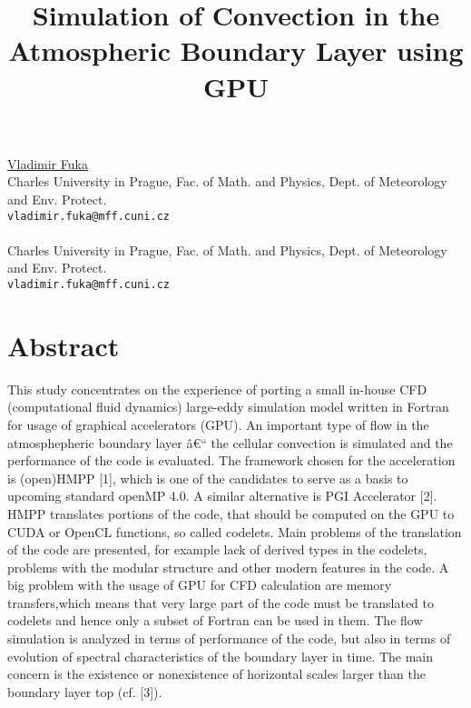 \title{Simulation of Convection in the Atmospheric Boundary Layer using GPU}
 \author{} \institute{}
\maketitle
\begin{center}
{\large \underline{Vladimir Fuka}}\\
Charles University in Prague, Fac. of Math. and Physics, Dept. of Meteorology and Env. Protect.\\
{\tt vladimir.fuka@mff.cuni.cz}
\\ \vspace{4mm}{\large Josef Brechler}\\
Charles University in Prague, Fac. of Math. and Physics, Dept. of Meteorology and Env. Protect.\\
{\tt vladimir.fuka@mff.cuni.cz}

\end{center}

\section*{Abstract}

This study concentrates on the experience of porting a small in-house CFD (computational fluid dynamics) large-eddy simulation model written in Fortran for usage of graphical accelerators (GPU). An important type of flow in the atmosphepheric boundary layer â€“ the cellular convection is simulated and the performance of the code is evaluated. The framework chosen for the acceleration is (open)HMPP [1], which is one of the candidates to serve as a basis to upcoming standard openMP 4.0. A similar alternative is PGI Accelerator [2]. HMPP translates portions of the code, that should be computed on the GPU to CUDA or OpenCL functions, so called codelets. Main problems of the translation of the code are presented, for example lack of derived types in the codelets, problems with the modular structure and other modern features in the code. A big problem with the usage of GPU for CFD calculation are memory transfers,which means that very large part of the code must be translated to codelets and hence only a subset of Fortran can be used in them. The flow simulation is analyzed in terms of performance of the code, but also in terms of evolution of spectral characteristics of the boundary layer in time. The main concern is the existence or nonexistence of horizontal scales larger than the boundary layer top (cf. [3]).


